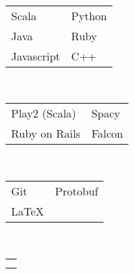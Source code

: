 {		\majorsection{\educationhistory} \quarterlinebreak \\
		\educationEvergreen \quarterlinebreak \\
		\educationHyogo
	}{ %
		
		\begin{minipage}[t]{0.25\textwidth}
			
			\minorsection{\skills}
			
			\textbf{\skillsprogramminglanguages} \\
			\begin{tabular}{l l}
				Scala &  Python  \\ 
				Java  & Ruby  \\ 
				Javascript & C++
			\end{tabular}
			
			\textbf{\skillsframeworks} \\
			\begin{tabular}{l l}
				Play2 (Scala) & Spacy  \\
				Ruby on Rails & Falcon 
			\end{tabular}
			
			\textbf{\skillsmisc} \\
			\begin{tabular}{l l}
				Git & Protobuf \\
				\LaTeX
			\end{tabular}
			
			\textbf{\skillslanguage} \\
			\begin{tabular}{l}
				\skillenglish \\
				\skilljapanese
			\end{tabular}\\
			
			\minorsection{\educationhistory} \\
			\educationEvergreen
			\educationHyogo
			
		\end{minipage}
		\hfill
		\begin{minipage}[t]{0.7\textwidth}
			\majorsection{\experience} \\
			\jobexpNPD
			\jobexpGSP
			\jobexpGDIIntern
			
			\majorsection{\awards} \quarterlinebreak \\
			\awardAmplify \quarterlinebreak\\
			\awardGoldenTicket \\
			
			\majorsection{\projects} \\
			\projectParasite
		\end{minipage}
		
	}
	
